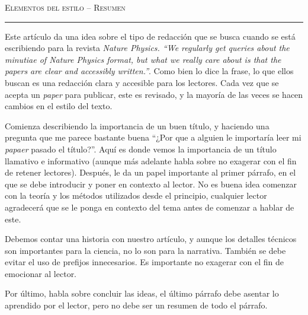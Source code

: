 \documentclass[11pt]{article}
\date{}
\newcommand{\myName}{Elementos del estilo \--- Resumen }
\theoremstyle{Tema} \newtheorem{Tema}{Tema} %
\theoremstyle{Tema} \newtheorem{Serie}{Serie}              %
\theoremstyle{Tema} \newtheorem{Ejercicio}{Ejercicio}    %
\begin{document}
\pagestyle{allStyle}

\thispagestyle{firststyle}
\begin{center}
\LARGE
\textsc{\myName} %
\medskip
\hrule height 1.5pt
\end{center}


\vspace{0.1 in}

Este artículo da una idea sobre el tipo de redacción que se busca cuando se está escribiendo para la revista \textit{Nature Physics. ``We regularly get queries about the minutiae of Nature Physics format, but what we really care about is that the papers are clear and accessibly written.''}\cite{NatElementsOfStyle}. Como bien lo dice la frase, lo que ellos buscan es una redacción clara y accesible para los lectores. Cada vez que se acepta un \textit{paper} para publicar, este es revisado, y la mayoría de las veces se hacen cambios en el estilo del texto.

\medskip

Comienza describiendo la importancia de un buen título, y haciendo una pregunta que me parece bastante buena  ``¿Por que a alguien le importaría leer mi \textit{papaer} pasado el título?''\cite{NatElementsOfStyle}. Aquí es donde vemos la importancia de un título llamativo e informativo (aunque más adelante habla sobre no exagerar con el fin de retener lectores).
Después, le da un papel importante al primer párrafo, en el que se debe introducir y poner en contexto al lector. No es buena idea comenzar con la teoría y los métodos utilizados desde el principio, cualquier lector agradecerá que se le ponga en contexto del tema antes de comenzar a hablar de este.

\medskip

Debemos contar una historia con nuestro artículo, y aunque los detalles técnicos son importantes para la ciencia, no lo son para la narrativa. También se debe evitar el uso de prefijos innecesarios.
Es importante no exagerar con el fin de emocionar al lector.

\medskip

Por último, habla sobre concluir las ideas, el último párrafo debe asentar lo aprendido por el lector, pero no debe ser un resumen de todo el párrafo.


\end{document}
